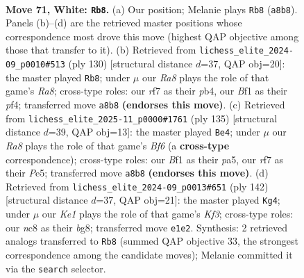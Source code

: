\documentclass[11pt]{article}
\begin{document}
\clearpage

\begin{figure}[p]\centering
\begin{subfigure}{0.46\textwidth}\centering
\resizebox{\linewidth}{!}{%
\newchessgame
\chessboard[
  setfen={R1n5/3k1r1p/P7/2P5/8/2p4P/2P3P1/4KB2 w - - 5 71},
  showmover=false,
  pgfstyle=straightmove, color=movearrow, markmove={a8-b8}
]}
\caption{}
\end{subfigure}\hfill
\begin{subfigure}{0.46\textwidth}\centering
\resizebox{\linewidth}{!}{%
\newchessgame
\chessboard[
  setfen={R1n5/2r5/P7/2p3KP/1p3p2/3P1P2/2k5/8 w - - 1 66},
  showmover=false,
  pgfstyle=straightmove, color=movearrow, markmove={a8-b8}
]}
\caption{}
\end{subfigure}
\\[4pt]
\begin{subfigure}{0.46\textwidth}\centering
\resizebox{\linewidth}{!}{%
\newchessgame
\chessboard[
  setfen={8/1p2k3/1P3p2/P3p1p1/6P1/2K2b2/3p4/1R6 b - - 1 68},
  showmover=false,
  pgfstyle=straightmove, color=movearrow, markmove={f3-e4}
]}
\caption{}
\end{subfigure}\hfill
\begin{subfigure}{0.46\textwidth}\centering
\resizebox{\linewidth}{!}{%
\newchessgame
\chessboard[
  setfen={3R2b1/7k/8/4B1pP/2pP4/2P2K1P/5P2/4r3 w - - 3 72},
  showmover=false,
  pgfstyle=straightmove, color=movearrow, markmove={f3-g4}
]}
\caption{}
\end{subfigure}
\caption{\textbf{Move 71, White: \texttt{Rb8}.} (a) Our position; Melanie plays \texttt{Rb8} (\texttt{a8b8}). Panels (b)--(d) are the retrieved master positions whose correspondence most drove this move (highest QAP objective among those that transfer to it). (b) Retrieved from \texttt{lichess\_elite\_2024-09\_p0010\#513} (ply 130) [structural distance $d$=37, QAP obj=20]: the master played \texttt{Rb8}; under $\mu$ our \emph{Ra8} plays the role of that game's \emph{Ra8}; cross-type roles: our \emph{r}f7 as their \emph{p}b4, our \emph{B}f1 as their \emph{p}f4; transferred move \texttt{a8b8} \textbf{(endorses this move)}. (c) Retrieved from \texttt{lichess\_elite\_2025-11\_p0000\#1761} (ply 135) [structural distance $d$=39, QAP obj=13]: the master played \texttt{Be4}; under $\mu$ our \emph{Ra8} plays the role of that game's \emph{Bf6} (a \textbf{cross-type} correspondence); cross-type roles: our \emph{B}f1 as their \emph{p}a5, our \emph{r}f7 as their \emph{P}e5; transferred move \texttt{a8b8} \textbf{(endorses this move)}. (d) Retrieved from \texttt{lichess\_elite\_2024-09\_p0013\#651} (ply 142) [structural distance $d$=37, QAP obj=21]: the master played \texttt{Kg4}; under $\mu$ our \emph{Ke1} plays the role of that game's \emph{Kf3}; cross-type roles: our \emph{n}c8 as their \emph{b}g8; transferred move \texttt{e1e2}. Synthesis: 2 retrieved analogs transferred to \texttt{Rb8} (summed QAP objective 33, the strongest correspondence among the candidate moves); Melanie committed it via the \texttt{search} selector.}
\label{fig:thought-m140}
\end{figure}
\end{document}
